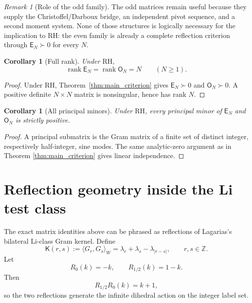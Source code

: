 \documentclass[preprint,12pt]{elsarticle}
\numberwithin{equation}{section}
\theoremstyle{plain}
\newtheorem{corollary}[theorem]{Corollary}
\theoremstyle{definition}
\theoremstyle{remark}
\newtheorem{remark}[theorem]{Remark}
\newcommand{\RH}{\mathrm{RH}}
\newcommand{\E}{\mathsf E}
\newcommand{\Omat}{\mathsf O}
\newcommand{\Kmat}{\mathsf K}
\newcommand{\rank}{\operatorname{rank}}
\begin{document}
\begin{remark}[Role of the odd family]
\label{rem:odd_not_needed_RH}
The odd matrices remain useful because they supply the Christoffel/Darboux bridge, an independent
pivot sequence, and a second moment system.  None of those structures is logically necessary for the
implication to \(\RH\): the even family is already a complete reflection criterion through
\(\E_N\succ0\) for every \(N\).
\end{remark}

\begin{corollary}[Full rank]
\label{cor:full_rank}
Under $\RH$,
\begin{equation}
\rank \E_N=\rank \Omat_N=N
\qquad(N\ge1).
\label{eq:full_rank}
\end{equation}
\end{corollary}

\begin{proof}
Under \(\RH\), Theorem~\ref{thm:main_criterion} gives
\(\E_N\succ0\) and \(\Omat_N\succ0\).  A positive definite \(N\times N\)
matrix is nonsingular, hence has rank \(N\).
\end{proof}

\begin{corollary}[All principal minors]
\label{cor:all_principal_minors}
Under $\RH$, every principal minor of $\E_N$ and $\Omat_N$ is strictly positive.
\end{corollary}

\begin{proof}
A principal submatrix is the Gram matrix of a finite set of distinct integer, respectively half-integer, sine modes. The same analytic-zero argument as in Theorem \ref{thm:main_criterion} gives linear independence.
\end{proof}

\section{Reflection geometry inside the Li test class}
\label{sec:reflection_compression}

The exact matrix identities above can be phrased as reflections of Lagarias's bilateral Li-class Gram kernel. Define
\begin{equation}
\Kmat(r,s):=\langle G_r,G_s\rangle_W
=\lambda_r+\lambda_s-\lambda_{|r-s|},
\qquad r,s\in\mathbb Z.
\label{eq:bilateral_kernel}
\end{equation}
Let
\begin{equation}
R_0(k)=-k,
\qquad
R_{1/2}(k)=1-k.
\label{eq:two_reflections}
\end{equation}
Then
\begin{equation}
R_{1/2}R_0(k)=k+1,
\label{eq:reflection_translation}
\end{equation}
so the two reflections generate the infinite dihedral action on the integer label set.
\end{document}
